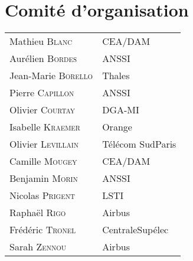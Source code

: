\section*{Comit\'e d'organisation}
\begin{tabular}{@{}p{5cm}@{}p{6.5cm}@{}}
  Mathieu  \textsc{Blanc}         & CEA/DAM             \\
  Aurélien \textsc{Bordes}        & ANSSI               \\
  Jean-Marie \textsc{Borello}     & Thales              \\
  Pierre   \textsc{Capillon}      & ANSSI               \\
  Olivier  \textsc{Courtay}       & DGA-MI              \\
  Isabelle \textsc{Kraemer}       & Orange              \\
  Olivier  \textsc{Levillain}     & Télécom SudParis    \\
  Camille  \textsc{Mougey}        & CEA/DAM             \\
  Benjamin \textsc{Morin}         & ANSSI               \\
  Nicolas  \textsc{Prigent}       & LSTI                \\
  Raphaël  \textsc{Rigo}          & Airbus              \\
  Frédéric \textsc{Tronel}        & CentraleSupélec     \\
  Sarah    \textsc{Zennou}        & Airbus              \\
\end{tabular}

\clearpage



